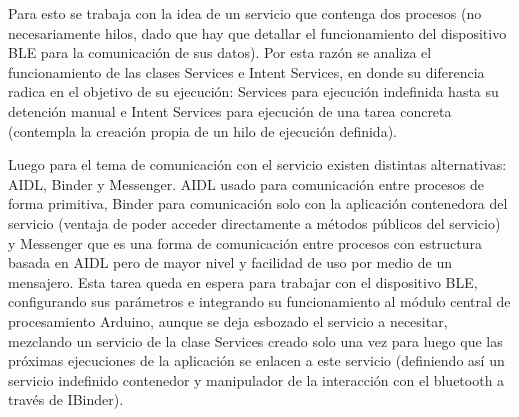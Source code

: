 Para esto se trabaja con la idea de un servicio que contenga dos procesos (no necesariamente hilos, dado que hay que detallar el funcionamiento del dispositivo BLE para la comunicación de sus datos). Por esta razón se analiza el funcionamiento de las clases Services e Intent Services, en donde su diferencia radica en el objetivo de su ejecución: Services para ejecución indefinida hasta su detención manual e Intent Services para ejecución de una tarea concreta (contempla la creación propia de un hilo de ejecución definida). \newline

Luego para el tema de comunicación con el servicio existen distintas alternativas: AIDL, Binder y Messenger. AIDL usado para comunicación entre procesos de forma primitiva, Binder para comunicación solo con la aplicación contenedora del servicio (ventaja de poder acceder directamente a métodos públicos del servicio) y Messenger que es una forma de comunicación entre procesos con estructura basada en AIDL pero de mayor nivel y facilidad de uso por medio de un mensajero. Esta tarea queda en espera para trabajar con el dispositivo BLE, configurando sus parámetros e integrando su funcionamiento al módulo central de procesamiento Arduino, aunque se deja esbozado el servicio a necesitar, mezclando un servicio de la clase Services creado solo una vez para luego que las próximas ejecuciones de la aplicación se enlacen a este servicio (definiendo así un servicio indefinido contenedor y manipulador de la interacción con el bluetooth a través de IBinder).

